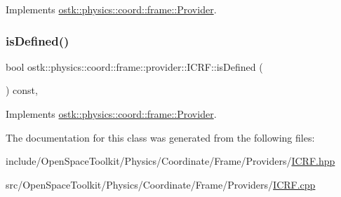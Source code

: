 Implements \hyperlink{classostk_1_1physics_1_1coord_1_1frame_1_1_provider_a38b86a589f46f8b8a9c97ab2776f37d1}{ostk\+::physics\+::coord\+::frame\+::\+Provider}.

\mbox{\label{classostk_1_1physics_1_1coord_1_1frame_1_1provider_1_1_i_c_r_f_a0d8e56478597e46dbc2c1867e6774398}} 
\subsubsection{\texorpdfstring{is\+Defined()}{isDefined()}}
{\footnotesize\ttfamily bool ostk\+::physics\+::coord\+::frame\+::provider\+::\+I\+C\+R\+F\+::is\+Defined (\begin{DoxyParamCaption}{ }\end{DoxyParamCaption}) const\hspace{0.3cm}{\ttfamily [override]}, {\ttfamily [virtual]}}



Implements \hyperlink{classostk_1_1physics_1_1coord_1_1frame_1_1_provider_a27acab0012649796b97956fed1a91493}{ostk\+::physics\+::coord\+::frame\+::\+Provider}.



The documentation for this class was generated from the following files\+:\begin{DoxyCompactItemize}
\item 
include/\+Open\+Space\+Toolkit/\+Physics/\+Coordinate/\+Frame/\+Providers/\hyperlink{_i_c_r_f_8hpp}{I\+C\+R\+F.\+hpp}\item 
src/\+Open\+Space\+Toolkit/\+Physics/\+Coordinate/\+Frame/\+Providers/\hyperlink{_i_c_r_f_8cpp}{I\+C\+R\+F.\+cpp}\end{DoxyCompactItemize}
